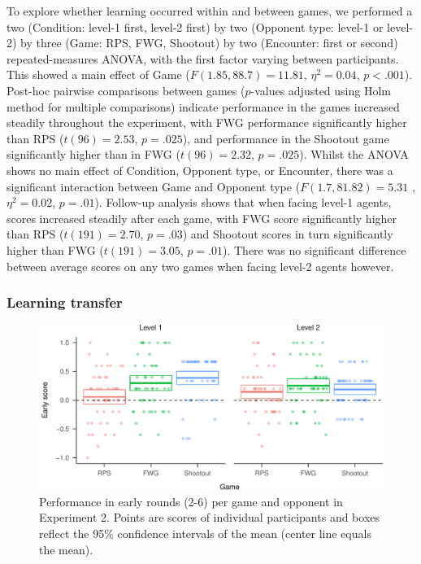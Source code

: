 \documentclass[
  english,
  man,floatsintext]{apa6}
\begin{document}
To explore whether learning occurred within and between games, we performed a two (Condition: level-1 first, level-2 first) by two (Opponent type: level-1 or level-2) by three (Game: RPS, FWG, Shootout) by two (Encounter: first or second) repeated-measures ANOVA, with the first factor varying between participants. This showed a main effect of Game (\(F(1.85,88.7) = 11.81\), \(\eta^{2} = 0.04\), \(p < .001\)). Post-hoc pairwise comparisons between games (\(p\)-values adjusted using Holm method for multiple comparisons) indicate performance in the games increased steadily throughout the experiment, with FWG performance significantly higher than RPS (\(t(96) =2.53\), \(p = .025\)), and performance in the Shootout game significantly higher than in FWG (\(t(96) = 2.32\), \(p = .025\)). Whilst the ANOVA shows no main effect of Condition, Opponent type, or Encounter, there was a significant interaction between Game and Opponent type (\(F(1.7, 81.82) = 5.31\) ,\(\eta^{2} = 0.02\), \(p = .01\)). Follow-up analysis shows that when facing level-1 agents, scores increased steadily after each game, with FWG score significantly higher than RPS (\(t(191) = 2.70\), \(p = .03\)) and Shootout scores in turn significantly higher than FWG (\(t(191) = 3.05\), \(p = .01\)). There was no significant difference between average scores on any two games when facing level-2 agents however.

\hypertarget{learning-transfer-1}{%
\subsubsection{Learning transfer}\label{learning-transfer-1}}

\begin{figure}

{\centering \includegraphics{paper_draft_2021_files/figure-latex/exp2-early-score-by-opp-1} 

}

\caption{\label{ref:figure4-caption}Performance in early rounds (2-6) per game and opponent in Experiment 2. Points are scores of individual participants and boxes reflect the 95\% confidence intervals of the mean (center line equals the mean).}\label{fig:exp2-early-score-by-opp}
\end{figure}
\end{document}
